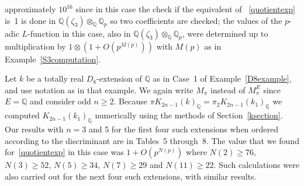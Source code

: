 \documentclass{amsart}
\begin{document}
approximately $ 10^{16} $ since in this case the check if the equivalent of ~\eqref{quotientexp} is~1
is done in $ {\mathbb Q}({\zeta}_3) {\otimes}_{\mathbb Q} {{\mathbb Q_p}} $ so two coefficients are checked;
the values of the {$p$-adic{\futurelet{}}} {$L$-function{\futurelet{}}} in this case, also in $ {\mathbb Q}({\zeta}_3){\otimes}_{\mathbb Q} {{\mathbb Q_p}} $, were determined
up to multiplication by $ 1{\otimes}(1+O(p^{M(p)})) $ with $ M(p) $ as in Example~\ref{S3computation}.

\begin{example}\label{D8realcomputation}
Let $ k $ be a totally real $ D_8 $-extension of $ {\mathbb Q} $ as in Case~1 of Example~\ref{D8example}, 
and use notation as in that example.  We again write $ M_\pi $ instead of $ M_\pi^E $ since $ E={\mathbb Q} $ and consider
odd $ n \ge 2 $.
Because $ \pi {K_{2n-1}(k)_{\mathbb Q}}= \pi_2 {K_{2n-1}(k_1)_{\mathbb Q}}$ we computed $ {K_{2n-1}(k_1)_{\mathbb Q}}$ numerically using the methods of Section~\ref{ksection}.
Our results with $ n=3 $ and 5 for the first four such extensions when ordered according to the discriminant
are in Tables~5 through~8.
The value that we found for~\eqref{quotientexp} in this case was $ 1+O(p^{N(p)}) $ where
$ N(2) \ge 76 $, $ N(3) \ge 52 $, $ N(5) \ge 34 $, $ N(7) \ge 29 $ and $ N(11) \ge 22 $.
Such calculations were also carried out for the next four such extensions, with similar results.
\end{example}
\end{document}
